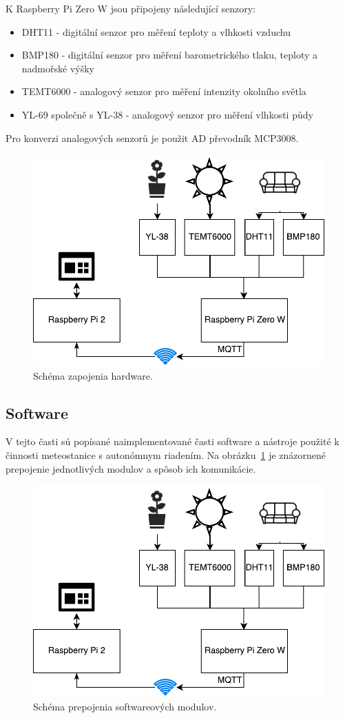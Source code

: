 \documentclass[11pt,a4paper]{article}
\begin{document}
K Raspberry Pi Zero W jsou připojeny následující senzory:

\begin{itemize}
    \item DHT11 - digitální senzor pro měření teploty a vlhkosti vzduchu
    \item BMP180 - digitální senzor pro měření barometrického tlaku, teploty a nadmořské výšky
    \item TEMT6000 - analogový senzor pro měření intenzity okolního světla
    \item YL-69 společně s YL-38 - analogový senzor pro měření vlhkosti půdy
\end{itemize}

Pro konverzi analogových senzorů je použit AD převodník MCP3008.

\begin{figure}[htb]
    \centering
    \includegraphics[width=0.5\linewidth]{weather-station-scheme}
    \caption{Schéma zapojenia hardware.}
\end{figure}

\subsection{Software}\label{subsec:sw}

V tejto časti sú popísané naimplementované časti software a nástroje použité
k činnosti meteostanice s autonómnym riadením.
Na obrázku~\ref{fig:sw-scheme} je znázornené prepojenie jednotlivých modulov
a spôsob ich komunikácie.

\begin{figure}[htb]
    \label{fig:sw-scheme}
    \centering
    \includegraphics[width=0.5\linewidth]{weather-station-scheme}
    \caption{Schéma prepojenia softwareových modulov.}
\end{figure}
\end{document}
